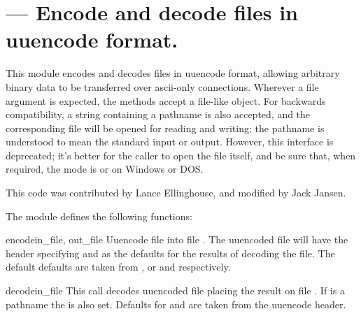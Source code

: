 \section{ ---
         Encode and decode files in uuencode format.}



This module encodes and decodes files in uuencode format, allowing
arbitrary binary data to be transferred over ascii-only connections.
Wherever a file argument is expected, the methods accept a file-like
object.  For backwards compatibility, a string containing a pathname
is also accepted, and the corresponding file will be opened for
reading and writing; the pathname  is understood to mean the
standard input or output.  However, this interface is deprecated; it's
better for the caller to open the file itself, and be sure that, when
required, the mode is  or  on Windows or DOS.

This code was contributed by Lance Ellinghouse, and modified by Jack
Jansen.

The  module defines the following functions:

\begin{funcdesc}{encode}{in_file, out_file}
Uuencode file  into file .  The uuencoded
file will have the header specifying  and  as the
defaults for the results of decoding the file. The default defaults
are taken from , or  and 
respectively. 
\end{funcdesc}

\begin{funcdesc}{decode}{in_file}
This call decodes uuencoded file  placing the result on
file . If  is a pathname the  is
also set. Defaults for  and  are taken from
the uuencode header.
\end{funcdesc}
